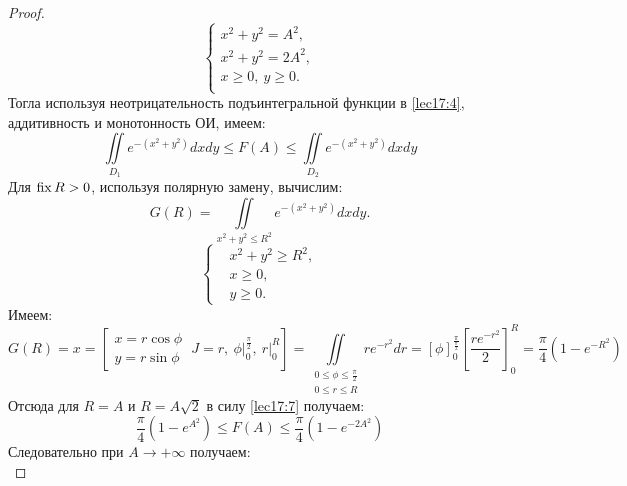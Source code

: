 \documentclass[../../main.tex]{subfiles}
\begin{document}
\begin{proof}
     \begin{equation}
		 	\label{lec17:6}
            \begin{cases}
                x^2 + y^2 = A^2,\\
                x^2 + y^2 = 2A^2,\\
                x \geq 0,\ y \geq 0.\\
            \end{cases}
		\end{equation}
  Тогла используя неотрицательность подъинтегральной 
  функции в \eqref{lec17:4}, аддитивность и монотонность ОИ, имеем:
	\begin{equation}
		\label{lec17:7}
		\iint\limits_{D_1}e^{-(x^2 + y^2)}dxdy \leq F(A) \leq
		\iint\limits_{D_2}e^{-(x^2 + y^2)}dxdy
	\end{equation}
    Для $\operatorname{fix} R > 0$, используя полярную замену, вычислим:
	\begin{equation}
        \label{lec17:8}
		G(R) = \iint\limits_{x^2 + y^2 \leq R^2}e^{-(x^2 + y^2)}dxdy.
	\end{equation}
    \begin{equation*}
        \begin{cases}
			&x^2 + y^2 \geq R^2,\\
			&x \geq 0,\\
			&y \geq 0.
		\end{cases}
    \end{equation*}
	Имеем:
    \begin{equation*}
        G(R) = x =
        \left[
        \begin{gathered} 
        x = r \cos \phi\\
        y = r \sin \phi\
        \end{gathered} 
        \
        J = r,\
        \phi \vert_0^{\frac{\pi}{2}},\
        r\vert_0^R
        \right]
        = \iint\limits_{\substack{0\leq\phi\leq \frac{\pi}{2}\\
				0 \leq r \leq R}}r e^{-r^2}dr =
        \left[ \phi \right]_0^{\frac{\pi}{\frac{\pi}{2}}}
        \left[ \frac{r e^{-r^2}}{2} \right]_0^{R} =
        \frac{\pi}{4}(1 - e^{-R^2})
	\end{equation*}
	Отсюда для $R = A$ и $R = A\sqrt{2}$ в силу \eqref{lec17:7} получаем:
	\begin{equation}
	 \frac{\pi}{4}(1 - e^{A^2}) \leq F(A) \leq
	 \frac{\pi}{4}(1 - e^{-2A^2})
	\end{equation}
    Следовательно при $A \to +\infty$ получаем:
    \begin{equation}

\end{equation}
\end{proof}
\end{document}
